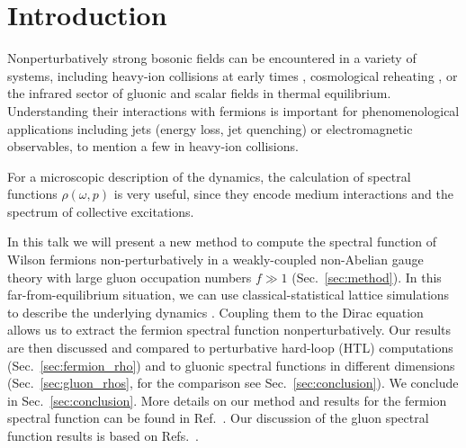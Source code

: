 \documentclass[]{webofc}
\newcommand{\se}{Sec.~}
\newcommand{\re}{Ref.~}
\newcommand{\res}{Refs.~}
\begin{document}

\maketitle
%

\section{Introduction}
\label{intro}

Nonperturbatively strong bosonic fields can be encountered in a variety of systems, including heavy-ion collisions at early times \cite{Schlichting:2019abc,Berges:2020fwq}, cosmological reheating \cite{Allahverdi:2010xz}, or the infrared sector of gluonic and scalar fields in thermal equilibrium. Understanding their interactions with fermions is important for phenomenological applications including jets (energy loss, jet quenching) or electromagnetic observables, to mention a few in heavy-ion collisions. 

For a microscopic description of 
the dynamics, the calculation of spectral functions $\rho(\omega,p)$ is very useful, since they encode medium interactions and the spectrum of collective excitations. 

In this talk we will present a new method to compute the spectral function of Wilson fermions non-perturbatively in a weakly-coupled non-Abelian gauge theory with large gluon occupation numbers $f \gg 1$ (\se\ref{sec:method}). In this far-from-equilibrium situation, we can use classical-statistical lattice simulations to describe the underlying dynamics \cite{Berges:2004yj,Berges:2013lsa}. Coupling them to the Dirac equation allows us to extract the fermion spectral function nonperturbatively. Our results are then discussed and compared to perturbative hard-loop (HTL) computations (\se\ref{sec:fermion_rho}) and to gluonic spectral functions in different dimensions (\se\ref{sec:gluon_rhos}, for the comparison see \se\ref{sec:conclusion}). We conclude in \se\ref{sec:conclusion}. More details on our method and results for the fermion spectral function can be found in \re\cite{Boguslavski:2021kdd}. Our discussion of the gluon spectral function results is based on \res\cite{Boguslavski:2021buh,Boguslavski:2018beu}.
\end{document}
